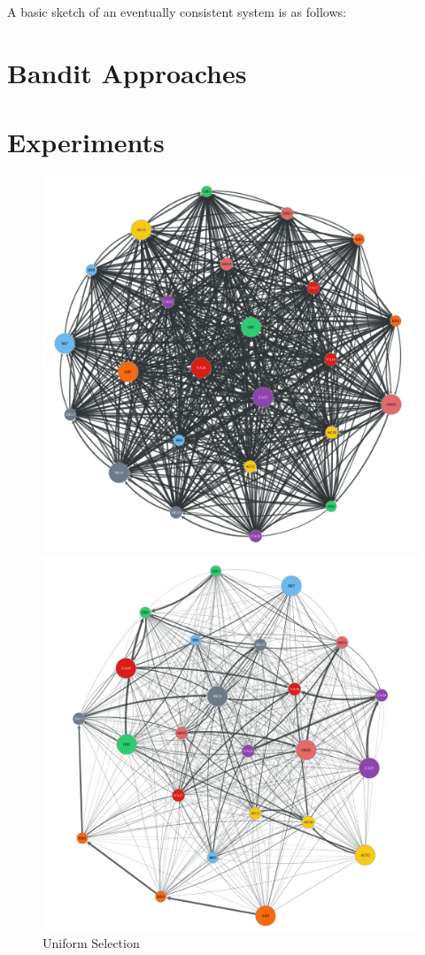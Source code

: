 A basic sketch of an eventually consistent system is as follows:

\section*{Bandit Approaches}

\section*{Experiments}

\begin{figure}[t]
    \centering
      \includegraphics[width=\linewidth]{figures/b-uniform-selection-e1}
      \caption{Uniform Selection}\label{fig:uniform_selection}
    \endminipage\hfill
      \includegraphics[width=\linewidth]{figures/b-epsilon-greedy-0-1-e2}

\end{figure}
